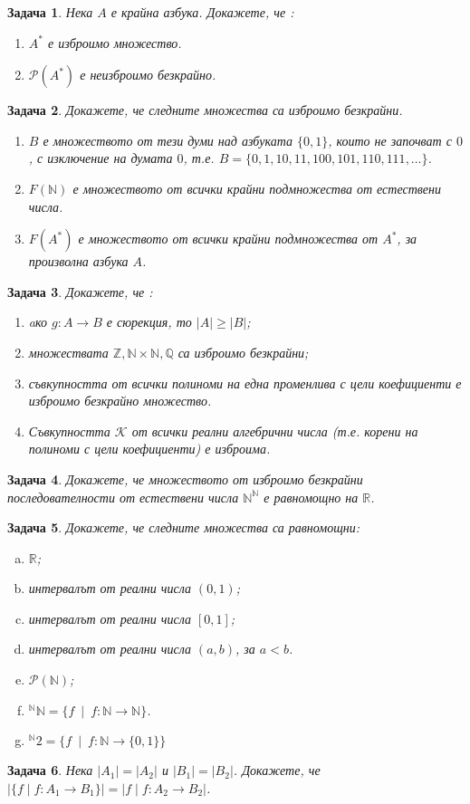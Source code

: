 \documentclass[a4paper]{article}
\newtheorem{problem}{Задача}
\newcommand{\Ps}{\mathscr{P}}
\newcommand{\N}{\mathbb{N}}
\newcommand{\Z}{\mathbb{Z}}
\newcommand{\Q}{\mathbb{Q}}
\newcommand{\R}{\mathbb{R}}
\begin{document}
\begin{problem}
  Нека $A$ е крайна азбука.
  Докажете, че :
  \begin{enumerate}[1)]
  \item
    $A^*$ е изброимо множество.
  \item
    $\Ps(A^*)$ е неизброимо безкрайно.
  \end{enumerate}
\end{problem}

\begin{problem}
  Докажете, че следните множества са изброимо безкрайни.
  \begin{enumerate}[1)]
  \item
    $B$ е множеството от тези думи над азбуката $\{0,1\}$, които не започват с $0$, с изключение на 
    думата $0$, т.е. $B = \{0, 1, 10, 11, 100, 101, 110, 111, \dots\}$.
  \item
    $F(\N)$ е множеството от всички крайни подмножества от естествени числа.
  \item
    $F(A^*)$ е множеството от всички крайни подмножества от $A^*$, за произволна азбука $A$.
  \end{enumerate}
\end{problem}


\begin{problem}
  Докажете, че :
  \begin{enumerate}
  \item
    aко $g:A\rightarrow B$ е сюрекция, то $|A|\geq |B|$;
  \item
    множествата $\Z,\N\times\N,\Q$ са изброимо безкрайни;
  \item
    съвкупността от всички полиноми на една променлива с цели коефициенти е изброимо безкрайно множество.
  \item
    Съвкупността $\mathscr{K}$ от всички реални алгебрични числа (т.е. корени на полиноми с цели коефициенти) е изброима.
  \end{enumerate}
\end{problem}

\begin{problem}
  Докажете, че множеството от изброимо безкрайни последователности от естествени числа $\N^{\N}$ е равномощно на $\R$.
\end{problem}

\begin{problem}
  Докажете, че следните множества са равномощни:
  \begin{enumerate}[a)]
  \item
    $\R$;
  \item
    интервалът от реални числа $(0,1)$;
\item
    интервалът от реални числа $[0,1]$;
  \item
    интервалът от реални числа $(a,b)$, за $a<b$.
  \item
    $\Ps(\N)$;
  \item
    $^\N\N = \{f\ \mid\ f:\N\to\N\}$.
  \item
    $^\N2 = \{f\ \mid\ f:\N\to\{0,1\}\}$
\end{enumerate}
\end{problem}

\begin{problem}
  Нека $|A_1| = |A_2|$ и $|B_1| = |B_2|$.
  Докажете, че $|\{f\mid f:A_1\to B_1\}| = |f\mid f:A_2\to B_2|$.
\end{problem}
\end{document}
